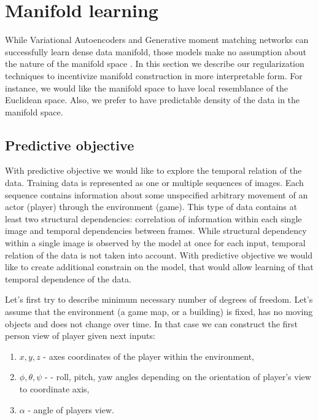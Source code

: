 \section{Manifold learning}\label{ss:mf}

While Variational Autoencoders and Generative moment matching networks can successfully learn dense data manifold, those models make no assumption about the nature of the manifold space \cite{Li2015, Ren2016, Kingma2013}.
In this section we describe our regularization techniques to incentivize manifold construction in more interpretable form.
For instance, we would like the manifold space to have local resemblance of the Euclidean space.
Also, we prefer to have predictable density of the data in the manifold space.

\subsection{Predictive objective}

With predictive objective we would like to explore the temporal relation of the data.
Training data is represented as one or multiple sequences of images.
Each sequence contains information about some unspecified arbitrary movement of an actor (player) through the environment (game).
This type of data contains at least two structural dependencies: correlation of information within each single image and temporal dependencies between frames.
While structural dependency within a single image is observed by the model at once for each input, temporal relation of the data is not taken into account.
With predictive objective we would like to create additional constrain on the model, that would allow learning of that temporal dependence of the data.

Let's first try to describe minimum necessary number of degrees of freedom.
Let's assume that the environment (a game map, or a building) is fixed, has no moving objects and does not change over time.
In that case we can construct the first person view of player given next inputs:
\begin{enumerate}
  \item $x, y, z$ - axes coordinates of the player within the environment,
  \item $\phi, \theta, \psi$ -  - roll, pitch, yaw angles depending on the orientation of player's view to coordinate axis,
  \item $\alpha$ - angle of players view.
\end{enumerate}

